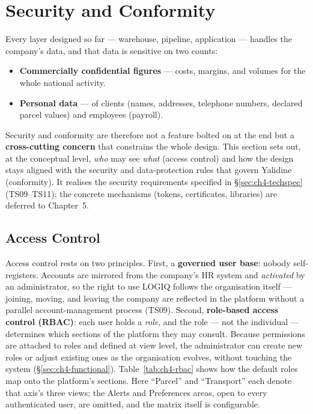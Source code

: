 \section{Security and Conformity}
\label{sec:ch4-security}

Every layer designed so far --- warehouse, pipeline, application --- handles the company's data, and
that data is sensitive on two counts:

\begin{itemize}[noitemsep]
    \item \textbf{Commercially confidential figures} --- costs, margins, and volumes for the whole
          national activity.
    \item \textbf{Personal data} --- of clients (names, addresses, telephone numbers, declared parcel
          values) and employees (payroll).
\end{itemize}

Security and conformity are therefore not a feature bolted on at the end but a \textbf{cross-cutting
concern} that constrains the whole design. This section sets out, at the conceptual level, \emph{who}
may see \emph{what} (access
control) and how the design stays aligned with the security and data-protection rules that govern
Yalidine (conformity). It realises the security requirements specified in \S\ref{sec:ch4-techspec}
(TS09--TS11); the concrete mechanisms (tokens, certificates, libraries) are deferred to Chapter~5.

\subsection{Access Control}

Access control rests on two principles. First, a \textbf{governed user base}: nobody self-registers.
Accounts are mirrored from the company's HR system and \emph{activated} by an administrator, so the
right to use LOGIQ follows the organisation itself --- joining, moving, and leaving the company are
reflected in the platform without a parallel account-management process (TS09). Second,
\textbf{role-based access control (RBAC)}: each user holds a \emph{role}, and the role --- not the
individual --- determines which sections of the platform they may consult. Because permissions are
attached to roles and defined at view level, the administrator can create new roles or adjust existing
ones as the organisation evolves, without touching the system (\S\ref{sec:ch4-functional}).
Table~\ref{tab:ch4-rbac} shows how the default roles map onto the platform's sections. Here
``Parcel'' and ``Transport'' each denote that axis's three views; the Alerts and Preferences areas,
open to every authenticated user, are omitted, and the matrix itself is configurable.

